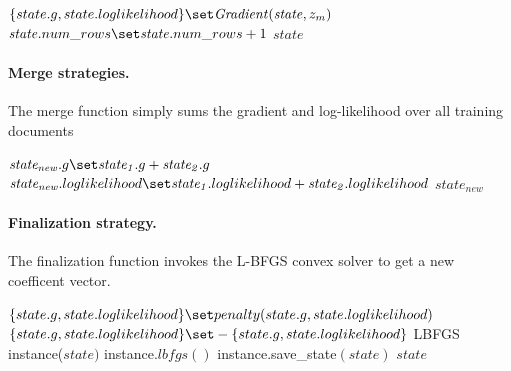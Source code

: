 \begin{algorithm} \label{alg:transition-lbfgs}
\begin{algorithmic}[1]
    \State $\{state.g,state.loglikelihood\}  \set \mathit{Gradient}(\mathit{state}, z_m)$
    \State $\mathit{state}.num\_rows \set \mathit{state}.num\_rows + 1$
    \State \Return $\mathit{state}$
\end{algorithmic}
\end{algorithm}


\paragraph{Merge strategies.}
The merge function simply sums the gradient and log-likelihood over all training documents
\begin{algorithm} \label{alg:merge-lbfgs}
\begin{algorithmic}[1]
    \State $\mathit{state_{new}}.g \set \mathit{state_1}.g + \mathit{state_2}.g$
    \State $\mathit{state_{new}}.loglikelihood \set \mathit{state_1}.loglikelihood + \mathit{state_2}.loglikelihood$
    \State \Return $\mathit{state_{new}}$
\end{algorithmic}
\end{algorithm}


\paragraph{Finalization strategy.}
The finalization function invokes the L-BFGS convex solver to get a new coefficent vector.\\

\begin{algorithm} \label{alg:CRF training}
\begin{algorithmic}[1]
        \State $\{state.g,state.loglikelihood\} \set penalty(state.g,state.loglikelihood)$ 
        \State $\{state.g,state.loglikelihood\}\set-\{state.g,state.loglikelihood\}$ 
        \State LBFGS instance($state)$ 
        \State instance.$lbfgs()$ 
        \State instance.save\_state$(state)$ 
        \State \Return $state$
\end{algorithmic}
\end{algorithm}

